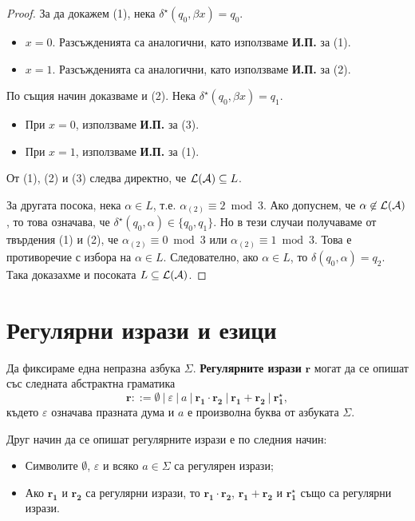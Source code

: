 \begin{proof}
  За да докажем (1), нека $\delta^\star(q_0,\beta x) = q_0$. 
  \begin{itemize}
  \item 
    $x = 0$. Разсъжденията са аналогични, като използваме {\bf И.П.} за (1).
  \item
    $x = 1$. Разсъжденията са аналогични, като използваме {\bf И.П.} за (2).
  \end{itemize}
  
  По същия начин доказваме и (2). Нека $\delta^\star(q_0,\beta x) = q_1$. 
  \begin{itemize}
  \item 
    При $x = 0$, използваме {\bf И.П.} за (3).
  \item
    При $x = 1$, използваме {\bf И.П.} за (1).
  \end{itemize}

  От (1), (2) и (3) следва директно, че $\mathcal{L}(\mathcal{A}) \subseteq L$.
  
  За другата посока, нека $\alpha \in L$, т.е. $\alpha_{(2)} \equiv 2 \bmod 3$.
  Ако допуснем, че $\alpha \not\in \mathcal{L}(\mathcal{A})$, то това означава, че $\delta^\star(q_0,\alpha) \in \{q_0,q_1\}$.
  Но в тези случаи получаваме от твърдения (1) и (2), че $\alpha_{(2)} \equiv 0 \bmod 3$ или $\alpha_{(2)} \equiv 1 \bmod 3$.
  Това е противоречие с избора на $\alpha \in L$. Следователно, ако $\alpha \in L$, то $\delta(q_0,\alpha) = q_2$.
  Така доказахме и посоката $L \subseteq \mathcal{L}(\mathcal{A})$.
\end{proof}

\section{Регулярни изрази и езици}

Да фиксираме една непразна азбука $\Sigma$.
{\bf Регулярните изрази} $\mathbf{r}$ могат да се опишат със следната абстрактна граматика
\[\mathbf{r} ::= \emptyset\ |\ \varepsilon\ |\ a\ |\ \mathbf{ r_1 \cdot r_2}\ |\ \mathbf{r_1 + r_2}\ |\ \mathbf{r^\star_1},\]
където $\varepsilon$ означава празната дума и $a$ е произволна буква от азбуката $\Sigma$.

Друг начин да се опишат регулярните изрази е по следния начин:
\begin{itemize}
\item 
  Символите $\emptyset$, $\varepsilon$ и всяко $a \in \Sigma$ са регулярен изрази;
\item
  Ако $\mathbf{r_1}$ и $\mathbf{r_2}$ са регулярни изрази, то $\mathbf{r_1 \cdot r_2}$, $\mathbf{r_1 + r_2}$ и $\mathbf{r^\star_1}$
  също са регулярни изрази.
\end{itemize}


